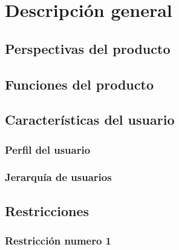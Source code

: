 \chapter{Descripci\'on general}
\section{Perspectivas del producto}
\section{Funciones del producto}
\section{Caracter\'isticas del usuario}
\subsection{Perfil del usuario}
\subsection{Jerarqu\'ia de usuarios}
\section{Restricciones}
\subsection{Restricci\'on numero 1}
